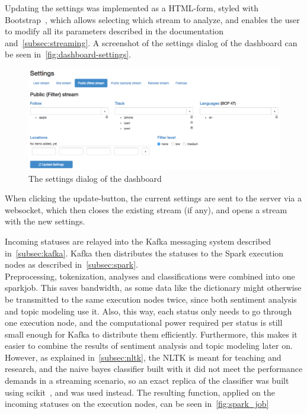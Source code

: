 Updating the settings was implemented as a HTML-form, styled with Bootstrap~\cite{bootstrapDocs},
which allows selecting which stream to analyze, and enables the user to modify all its parameters
described in the documentation~\cite{twitterDocs} and~\autoref{subsec:streaming}.
A screenshot of the settings dialog of the dashboard can be seen in~\autoref{fig:dashboard-settings}.

\begin{figure}
    \centering
    \caption{The settings dialog of the dashboard}
    \label{fig:dashboard-settings}
    \includegraphics[width=\textwidth]{../images/dashboard_settings.png}
\end{figure}

When clicking the update-button, the current settings are sent to the server via a websocket,
which then closes the existing stream (if any), and opens a stream with the new settings.
\par
Incoming statuses are relayed into the Kafka messaging system described in~\autoref{subsec:kafka}.
Kafka then distributes the statuses to the Spark execution nodes as described in~\autoref{subsec:spark}.
\\
Preprocessing, tokenization, analyses and classifications were combined into one sparkjob.
This saves bandwidth, as some data like the dictionary might otherwise be transmitted to the same execution nodes twice,
since both sentiment analysis and topic modeling use it.
Also, this way, each status only needs to go through one execution node,
and the computational power required per status is still small enough for Kafka to distribute them efficiently.
Furthermore, this makes it easier to combine the results of sentiment analysis and topic modeling later on.
However, as explained in~\autoref{subsec:nltk}, the NLTK is meant for teaching and research,
and the naive bayes classifier built with it did not meet the performance demands in a streaming scenario,
so an exact replica of the classifier was built using scikit~\cite{scikitDocs}, and was used instead.
The resulting function, applied on the incoming statuses on the execution nodes, can be seen in~\autoref{fig:spark_job}

